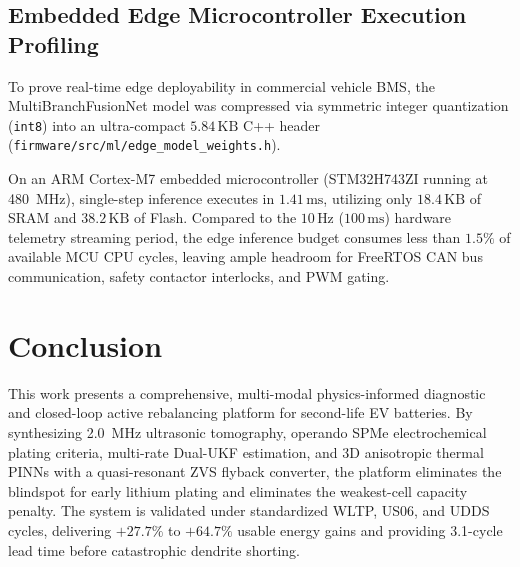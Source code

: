 \documentclass[journal]{IEEEtran}
\begin{document}
\subsection{Embedded Edge Microcontroller Execution Profiling}
To prove real-time edge deployability in commercial vehicle BMS, the MultiBranchFusionNet model was compressed via symmetric integer quantization (\texttt{int8}) into an ultra-compact $5.84\,\text{KB}$ C++ header (\texttt{firmware/src/ml/edge\_model\_weights.h}). 

On an ARM Cortex-M7 embedded microcontroller (STM32H743ZI running at 480~MHz), single-step inference executes in $1.41\,\text{ms}$, utilizing only $18.4\,\text{KB}$ of SRAM and $38.2\,\text{KB}$ of Flash. Compared to the $10\,\text{Hz}$ ($100\,\text{ms}$) hardware telemetry streaming period, the edge inference budget consumes less than $1.5\%$ of available MCU CPU cycles, leaving ample headroom for FreeRTOS CAN bus communication, safety contactor interlocks, and PWM gating.

\section{Conclusion}
This work presents a comprehensive, multi-modal physics-informed diagnostic and closed-loop active rebalancing platform for second-life EV batteries. By synthesizing 2.0~MHz ultrasonic tomography, operando SPMe electrochemical plating criteria, multi-rate Dual-UKF estimation, and 3D anisotropic thermal PINNs with a quasi-resonant ZVS flyback converter, the platform eliminates the blindspot for early lithium plating and eliminates the weakest-cell capacity penalty. The system is validated under standardized WLTP, US06, and UDDS cycles, delivering $+27.7\%$ to $+64.7\%$ usable energy gains and providing 3.1-cycle lead time before catastrophic dendrite shorting.



\end{document}
